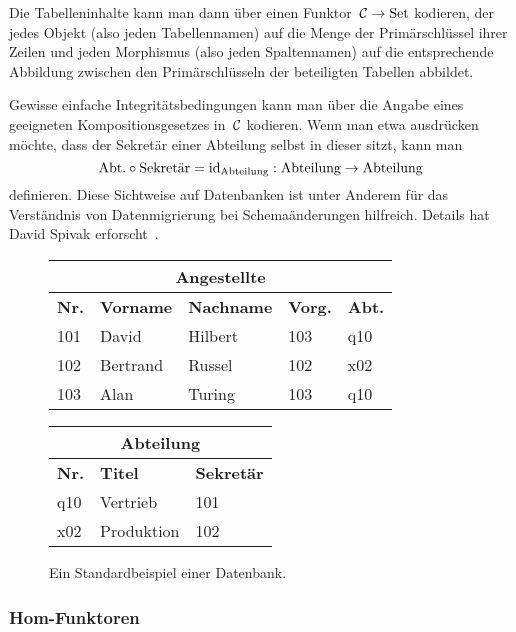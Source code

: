 Die Tabelleninhalte kann man dann über einen Funktor~$\mathcal{C} \to \mathrm{Set}$ kodieren,
der jedes Objekt (also jeden Tabellennamen) auf die Menge der Primärschlüssel
ihrer Zeilen und jeden Morphismus (also jeden Spaltennamen) auf die
entsprechende Abbildung zwischen den Primärschlüsseln der beteiligten Tabellen
abbildet.

Gewisse einfache Integritätsbedingungen kann man über die Angabe eines
geeigneten Kompositionsgesetzes in~$\mathcal{C}$ kodieren. Wenn man etwa ausdrücken
möchte, dass der Sekretär einer Abteilung selbst in dieser sitzt, kann man
\[ \text{Abt.} \circ \text{Sekretär} = \mathrm{id}_{\text{Abteilung}} :
  \text{Abteilung} \to \text{Abteilung} \]
definieren. Diese Sichtweise auf Datenbanken ist unter Anderem für das
Verständnis von Datenmigrierung bei Schemaänderungen hilfreich. Details hat
David Spivak erforscht~\cite{spivak1,spivak2,spivak3}.

\begin{figure}
  \centering
  \small
  \begin{tabular}{|l||l|l|l|l|}
    \hline
    \multicolumn{5}{|c|}{Angestellte} \\ \hline
    \textbf{Nr.} & \textbf{Vorname} & \textbf{Nachname} & \textbf{Vorg.} & \textbf{Abt.} \\ \hline
    101 & David & Hilbert & 103 & q10 \\
    102 & Bertrand & Russel & 102 & x02 \\
    103 & Alan & Turing & 103 & q10 \\
    \hline
  \end{tabular}
  \quad
  \begin{tabular}{|l||l|l|}
    \hline
    \multicolumn{3}{|c|}{Abteilung} \\ \hline
    \textbf{Nr.} & \textbf{Titel} & \textbf{Sekretär} \\ \hline
    q10 & Vertrieb & 101 \\
    x02 & Produktion & 102 \\
    \hline
  \end{tabular}

  \caption{\label{db0815}Ein Standardbeispiel einer Datenbank.}
\end{figure}

\subsubsection{Hom-Funktoren}

